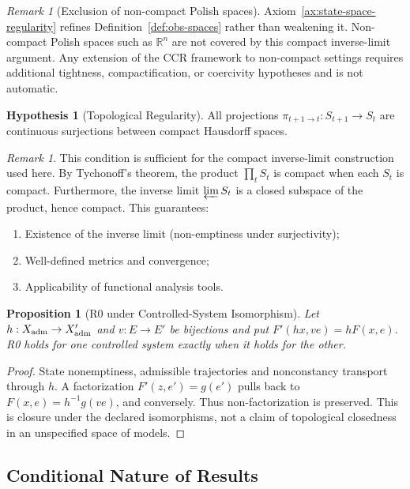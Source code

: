 \documentclass[11pt,a4paper]{article}
\theoremstyle{plain}
\newtheorem{proposition}[theorem]{Proposition}
\theoremstyle{definition}
\newtheorem{hypothesis}[theorem]{Hypothesis}
\theoremstyle{remark}
\newtheorem{remark}[theorem]{Remark}
\begin{document}
\begin{remark}[Exclusion of non-compact Polish spaces]\label{rem:noncompact-polish-exclusion}
Axiom~\ref{ax:state-space-regularity} refines Definition~\ref{def:obs-spaces} rather than weakening it. Non-compact Polish spaces such as $\mathbb{R}^n$ are not covered by this compact inverse-limit argument. Any extension of the CCR framework to non-compact settings requires additional tightness, compactification, or coercivity hypotheses and is not automatic.
\end{remark}

\begin{hypothesis}[Topological Regularity]\label{hyp:topo}
All projections $\pi_{t+1 \to t}: S_{t+1} \to S_t$ are continuous surjections between compact Hausdorff spaces.
\end{hypothesis}

\begin{remark}
This condition is sufficient for the compact inverse-limit construction used here. By Tychonoff's theorem, the product $\prod_{t} S_t$ is compact when each $S_t$ is compact. Furthermore, the inverse limit $\varprojlim S_t$ is a closed subspace of the product, hence compact. This guarantees:
\begin{enumerate}[leftmargin=*]
    \item Existence of the inverse limit (non-emptiness under surjectivity);
    \item Well-defined metrics and convergence;
    \item Applicability of functional analysis tools.
\end{enumerate}
\end{remark}

\begin{proposition}[R0 under Controlled-System Isomorphism]\label{prop:a0-closed}
Let $h:X_{\rm adm}\to X'_{\rm adm}$ and $v:E\to E'$ be bijections and put $F'(hx,ve)=hF(x,e)$. R0 holds for one controlled system exactly when it holds for the other.
\end{proposition}
\begin{proof}
State nonemptiness, admissible trajectories and nonconstancy transport through $h$. A factorization $F'(z,e')=g(e')$ pulls back to $F(x,e)=h^{-1}g(ve)$, and conversely. Thus non-factorization is preserved. This is closure under the declared isomorphisms, not a claim of topological closedness in an unspecified space of models.
\end{proof}

\subsection{Conditional Nature of Results}
\end{document}
